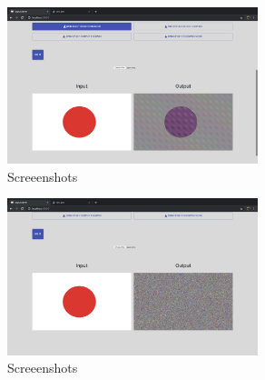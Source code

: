 \documentclass[fleqn, journal, onecolumn]{IEEEtran}             %
\theoremstyle{break}                                            %
\begin{document}
    \begin{figure}[h]
      \includegraphics[width=0.65\textwidth]{data2}
      \caption{Screeenshots}
    \end{figure}

    \begin{figure}[h]
      \includegraphics[width=0.65\textwidth]{data3}
      \caption{Screeenshots}
    \end{figure}
\end{document}
